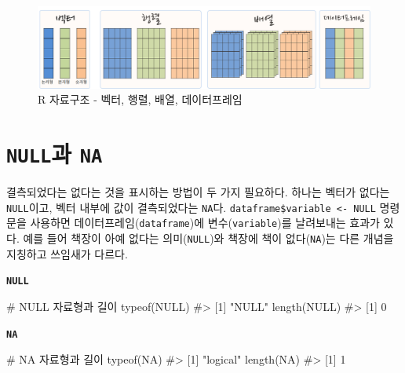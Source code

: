 \documentclass[
  letterpaper,
]{book}
\newenvironment{Shaded}{\begin{snugshade}}{\end{snugshade}}
\newcommand{\CommentTok}[1]{\textcolor[rgb]{0.37,0.37,0.37}{#1}}
\newcommand{\ConstantTok}[1]{\textcolor[rgb]{0.56,0.35,0.01}{#1}}
\newcommand{\FunctionTok}[1]{\textcolor[rgb]{0.28,0.35,0.67}{#1}}
\newcommand{\NormalTok}[1]{\textcolor[rgb]{0.00,0.23,0.31}{#1}}
\begin{document}
\begin{figure}[H]

{\centering \includegraphics[width=1\textwidth,height=\textheight]{images/ds-data-structure-pictogram.png}

}

\caption{R 자료구조 - 벡터, 행렬, 배열, 데이터프레임}

\end{figure}%

\section{\texorpdfstring{\texttt{NULL}과
\texttt{NA}}{NULL과 NA}}\label{is-na-null}

결측되었다는 없다는 것을 표시하는 방법이 두 가지 필요하다. 하나는 벡터가
없다는 \texttt{NULL}이고, 벡터 내부에 값이 결측되었다는 \texttt{NA}다.
\texttt{dataframe\$variable\ \textless{}-\ NULL} 명령문을 사용하면
데이터프레임(\texttt{dataframe})에 변수(\texttt{variable})를 날려보내는
효과가 있다. 예를 들어 책장이 아예 없다는 의미(\texttt{NULL})와 책장에
책이 없다(\texttt{NA})는 다른 개념을 지칭하고 쓰임새가 다르다.
 

\textbf{\texttt{NULL}}

\begin{Shaded}
\begin{Highlighting}[]
\CommentTok{\# NULL 자료형과 길이}
\FunctionTok{typeof}\NormalTok{(}\ConstantTok{NULL}\NormalTok{)}
\CommentTok{\#\textgreater{} [1] "NULL"}
\FunctionTok{length}\NormalTok{(}\ConstantTok{NULL}\NormalTok{)}
\CommentTok{\#\textgreater{} [1] 0}
\end{Highlighting}
\end{Shaded}

\textbf{\texttt{NA}}

\begin{Shaded}
\begin{Highlighting}[]
\CommentTok{\# NA 자료형과 길이}
\FunctionTok{typeof}\NormalTok{(}\ConstantTok{NA}\NormalTok{)}
\CommentTok{\#\textgreater{} [1] "logical"}
\FunctionTok{length}\NormalTok{(}\ConstantTok{NA}\NormalTok{)}
\CommentTok{\#\textgreater{} [1] 1}
\end{Highlighting}
\end{Shaded}
\end{document}
